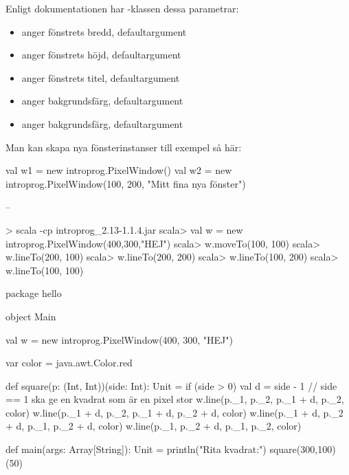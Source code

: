 \SubtaskSolved Enligt dokumentationen har -klassen dessa parametrar:
\begin{itemize}[nolistsep,noitemsep]
  \item {} anger fönstrets bredd, defaultargument 
  \item {} anger fönstrets höjd, defaultargument 
  \item {} anger fönstrets titel, defaultargument 
  \item {} anger bakgrundsfärg, defaultargument 
  \item {} anger bakgrundsfärg, defaultargument 
\end{itemize}
Man kan skapa nya fönsterinstanser till exempel så här:
\begin{Code}
val w1 = new introprog.PixelWindow()
val w2 = new introprog.PixelWindow(100, 200, "Mitt fina nya fönster")
\end{Code}

\SubtaskSolved --

\SubtaskSolved
\begin{REPL}
> scala -cp introprog_2.13-1.1.4.jar
scala> val w = new introprog.PixelWindow(400,300,"HEJ")
scala> w.moveTo(100, 100)
scala> w.lineTo(200, 100)
scala> w.lineTo(200, 200)
scala> w.lineTo(100, 200)
scala> w.lineTo(100, 100)
\end{REPL}

\SubtaskSolved
\begin{Code}
package hello

object Main {
  val w = new introprog.PixelWindow(400, 300, "HEJ")

  var color = java.awt.Color.red

  def square(p: (Int, Int))(side: Int): Unit = if (side > 0) {
    val d = side - 1  // side == 1 ska ge en kvadrat som är en pixel stor
    w.line(p._1,     p._2,     p._1 + d, p._2,     color)
    w.line(p._1 + d, p._2,     p._1 + d, p._2 + d, color)
    w.line(p._1 + d, p._2 + d, p._1,     p._2 + d, color)
    w.line(p._1,     p._2 + d, p._1,     p._2,     color)
  }

  def main(args: Array[String]): Unit = {
    println("Rita kvadrat:")
    square(300,100)(50)
  }
}

\end{Code}



